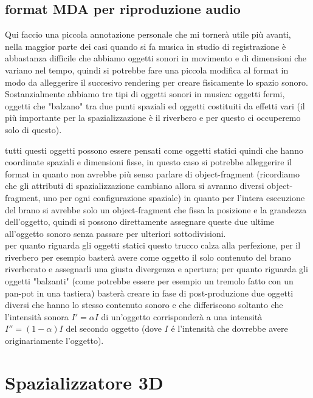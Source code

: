 \documentclass[12pt,a4paper]{report}
\begin{document}
\subsection{format MDA per riproduzione audio}

Qui faccio una piccola annotazione personale che mi tornerà utile più avanti, nella maggior parte dei casi quando si fa musica in studio di registrazione è abbastanza difficile che abbiamo oggetti sonori in movimento e di dimensioni che variano nel tempo, quindi si potrebbe fare una piccola modifica al format in modo da alleggerire il succesivo rendering per creare fisicamente lo spazio sonoro.\\

Sostanzialmente abbiamo tre tipi di oggetti sonori in musica: oggetti fermi, oggetti che "balzano" tra due punti spaziali ed oggetti costituiti da effetti vari (il più importante per la spazializzazione è il riverbero e per questo ci occuperemo solo di questo).

tutti questi oggetti possono essere pensati come oggetti statici quindi che hanno coordinate spaziali e dimensioni fisse, in questo caso si potrebbe alleggerire il format in quanto non avrebbe più senso parlare di object-fragment (ricordiamo che gli attributi di spazializzazione cambiano allora si avranno diversi object-fragment, uno per ogni configurazione spaziale) in quanto per l'intera esecuzione del brano si avrebbe solo un object-fragment che fissa la posizione e la grandezza dell'oggetto, quindi si possono direttamente assegnare queste due ultime all'oggetto sonoro senza passare per ulteriori sottodivisioni.\\

per quanto riguarda gli oggetti statici questo trucco calza alla perfezione, per il riverbero per esempio basterà avere come oggetto il solo contenuto del brano riverberato e assegnarli una giusta divergenza e apertura; per quanto riguarda gli oggetti "balzanti" (come potrebbe essere per esempio un tremolo fatto con un pan-pot in una tastiera) basterà creare in fase di post-produzione due oggetti diversi che hanno lo stesso contenuto sonoro e che differiscono soltanto che l'intensità sonora $I'=\alpha I$ di un'oggetto corrisponderà a una intensità $I''=(1-\alpha) I$ del secondo oggetto (dove $I$ é l'intensità che dovrebbe avere originariamente l'oggetto).

\section{Spazializzatore 3D}
\end{document}
